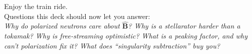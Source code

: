 \documentclass[11pt,aspectratio=169]{beamer}
\newcommand{\bhat}{\hat{\mathbf{B}}}
\begin{document}
\begin{frame}{}
\begin{center}\Large Enjoy the train ride.\\[1em]
\normalsize Questions this deck should now let you answer:\\
\emph{Why do polarized neutrons care about $\bhat$? Why is a stellarator harder than a
tokamak? Why is free-streaming optimistic? What is a peaking factor, and why can't
polarization fix it? What does ``singularity subtraction'' buy you?}
\end{center}
\end{frame}
\end{document}
